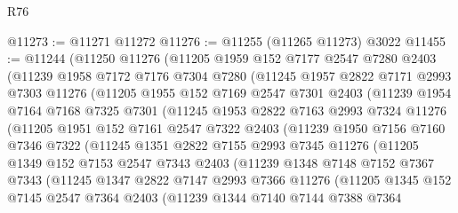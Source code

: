 \begin{lexlean}{R76}
\begin{coremodule}
@11273 := @11271 @11272
@11276 := @11255 (@11265 @11273) @3022
@11455 := @11244
    (@11250
      @11276
      (@11205
        @1959
        @152
        @7177
        @2547
        @7280
        @2403
        (@11239
          @1958
          @7172
          @7176
          @7304
          @7280
          (@11245
            @1957
            @2822
            @7171
            @2993
            @7303
            @11276
            (@11205
              @1955
              @152
              @7169
              @2547
              @7301
              @2403
              (@11239
                @1954
                @7164
                @7168
                @7325
                @7301
                (@11245
                  @1953
                  @2822
                  @7163
                  @2993
                  @7324
                  @11276
                  (@11205
                    @1951
                    @152
                    @7161
                    @2547
                    @7322
                    @2403
                    (@11239
                      @1950
                      @7156
                      @7160
                      @7346
                      @7322
                      (@11245
                        @1351
                        @2822
                        @7155
                        @2993
                        @7345
                        @11276
                        (@11205
                          @1349
                          @152
                          @7153
                          @2547
                          @7343
                          @2403
                          (@11239
                            @1348
                            @7148
                            @7152
                            @7367
                            @7343
                            (@11245
                              @1347
                              @2822
                              @7147
                              @2993
                              @7366
                              @11276
                              (@11205
                                @1345
                                @152
                                @7145
                                @2547
                                @7364
                                @2403
                                (@11239
                                  @1344
                                  @7140
                                  @7144
                                  @7388
                                  @7364

\end{coremodule}
\end{lexlean}
